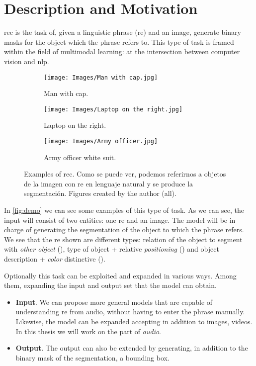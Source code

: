 \section{Description and Motivation}\label{sec:description}

\gls{rec} is the task of, given a linguistic phrase (\gls{re}) and an image,
generate binary masks for the object which the phrase refers to. This type of
task is framed within the field of multimodal learning: at the intersection
between computer vision and \gls{nlp}.

\begin{figure}[ht]
  \centering
  \begin{subfigure}[t]{.32\textwidth}
    \centering
    \caption{Man with cap.}
    \texttt{[image: Images/Man with cap.jpg]}
  \end{subfigure}\hfill
  \begin{subfigure}[t]{.32\textwidth}
    \centering
    \caption{Laptop on the right.}
    \texttt{[image: Images/Laptop on the right.jpg]}
  \end{subfigure}\hfill
  \begin{subfigure}[t]{.32\textwidth}
    \centering
    \caption{Army officer white suit.}
    \texttt{[image: Images/Army officer.jpg]}
  \end{subfigure}
  \caption[Examples of \acl*{rec}]{Examples of \acl{rec}. Como se puede ver,
    podemos referirnos a objetos de la imagen con \gls{re} en lenguaje natural
    y se produce la segmentación. Figures created by the author
    (all).}\label{fig:demo}
\end{figure}

In \vref{fig:demo} we can see some examples of this type of task. As we can
see, the input will consist of two entities: one \gls{re} and an image. The
model will be in charge of generating the segmentation of the object to which
the phrase refers. We see that the \gls{re} shown are different types: relation
of the object to segment with \emph{other object} (), type
of object + relative \emph{positioning} () and object
description + \emph{color} distinctive ().

Optionally this task can be exploited and expanded in various ways. Among them,
expanding the input and output set that the model can obtain.
\begin{itemize}
  \item \textbf{Input}. We can propose more general models that are capable
  of understanding \gls{re} from audio, without having to enter the phrase
  manually. Likewise, the model can be expanded accepting in addition to
  images, videos. In this thesis we will work on the part of \emph{audio}.
  \item \textbf{Output}. The output can also be extended by generating, in
  addition to the binary mask of the segmentation, a bounding box.
\end{itemize}

